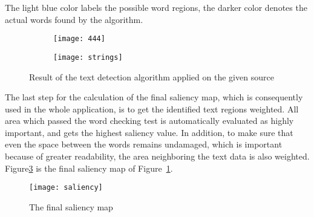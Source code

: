 \documentclass[draft,final]{vutinfth} %
\begin{document}
	The light blue color labels the possible word regions, the darker color denotes the actual words found by the algorithm.\par 
	\begin{figure}
		\centering
		\begin{subfigure}[b]{0.45\columnwidth}
			\centering
			\texttt{[image: 444]}
			\label{fig:strings:org}
		\end{subfigure}
		\begin{subfigure}[b]{0.45\columnwidth}
			\centering
			\texttt{[image: strings]}
		\end{subfigure}
		\caption{Result of the text detection algorithm applied on the given source}
		\label{fig:strings} %
	\end{figure}
	The last step for the calculation of the final saliency map, which is consequently used in the whole application, is to get the identified text regions weighted. 
	All area which passed the word checking test is automatically evaluated as highly important, and gets the highest saliency value.
	In addition, to make sure that even the space between the words remains undamaged, which is important because of greater readability, the area neighboring the text data is also weighted.
	Figure\ref{fig:saliency} is the final saliency map of Figure~\ref{fig:strings:org}.
	\begin{figure}[h]
		\centering		
		\texttt{[image: saliency]}
		\caption{The final saliency map}
		\label{fig:saliency}
	\end{figure}
	
\end{document}
